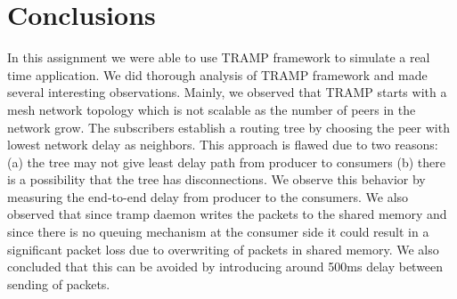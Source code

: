 \documentclass[12pt, conference, compsocconf, letterpaper]{IEEEtran}
\begin{document}
















\section{Conclusions}
In this assignment we were able to use TRAMP framework to simulate a real time application. We did thorough analysis of TRAMP framework and made several interesting observations. Mainly, we observed that TRAMP starts with a mesh network topology which is not scalable as the number of peers in the network grow. The subscribers establish a routing tree by choosing the peer with lowest network delay as neighbors. This approach is flawed due to two reasons: (a) the tree may not give least delay path from producer to consumers (b) there is a possibility that the tree has disconnections. We observe this behavior by measuring the end-to-end delay from producer to the consumers. We also observed that since tramp daemon writes the packets to the shared memory and since there is no queuing mechanism at the consumer side it could result in a significant packet loss due to overwriting of packets in shared memory. We also concluded that this can be avoided by introducing around 500ms delay between sending of packets.




  


\end{document}

